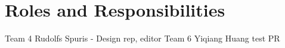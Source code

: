 \chapter{Roles and Responsibilities}

Team 4 Rudolfs Spuris - Design rep, editor
Team 6 Yiqiang Huang test PR
